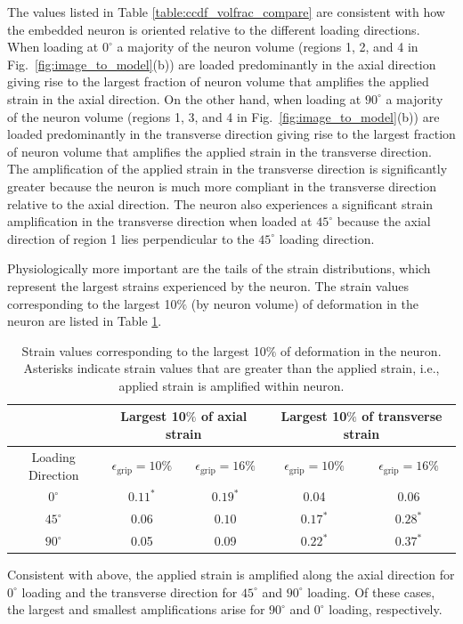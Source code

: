 \documentclass[]{interact}
\begin{document}
The values listed in Table \ref{table:ccdf_volfrac_compare} are consistent with how the embedded neuron is oriented relative to the different loading directions. When loading at $0^{\circ}$ a majority of the neuron volume (regions 1, 2, and 4 in Fig.\ \ref{fig:image_to_model}(b)) are loaded predominantly in the axial direction giving rise to the largest fraction of neuron volume that amplifies the applied strain in the axial direction. On the other hand, when loading at $90^{\circ}$ a majority of the neuron volume (regions 1, 3, and 4 in Fig.\ \ref{fig:image_to_model}(b)) are loaded predominantly in the transverse direction giving rise to the largest fraction of neuron volume that amplifies the applied strain in the transverse direction. The amplification of the applied strain in the transverse direction is significantly greater because the neuron is much more compliant in the transverse direction relative to the axial direction.  The neuron also experiences a significant strain amplification in the transverse direction when loaded at $45^{\circ}$ because the axial direction of region 1 lies perpendicular to the $45^{\circ}$ loading direction.

Physiologically more important are the tails of the strain distributions, which represent the largest strains experienced by the neuron. The strain values corresponding to the largest 10$\%$ (by neuron volume) of deformation in the neuron are listed in Table \ref{table:ccdf_tail_strains}. 
%
\begin{table}[ht]
\begin{center}
\begin{tabular}{ c c c c c }
\hline\hline
& \multicolumn{2}{c}{Largest 10$\%$ of axial strain} & \multicolumn{2}{c}{Largest 10$\%$ of transverse strain} \\ \hline 
Loading Direction & $\epsilon_{\text{grip}}=10\%$ & $\epsilon_{\text{grip}}=16\%$ & $\epsilon_{\text{grip}}=10\%$ & $\epsilon_{\text{grip}}=16\%$ \\
\hline 
$0^{\circ}$ & $0.11^*$ & $0.19^*$ & 0.04 & 0.06\\ 
$45^{\circ}$ & $0.06$ & $0.10$ & $0.17^*$ & $0.28^*$\\
$90^{\circ}$ & 0.05 & 0.09 & $0.22^*$ & $0.37^*$\\ \hline \hline
\end{tabular}
\end{center}
\caption{Strain values corresponding to the largest 10$\%$ of deformation in the neuron. Asterisks indicate strain values that are greater than the applied strain, i.e., applied strain is amplified within neuron.}
\label{table:ccdf_tail_strains}
\end{table}
%
Consistent with above, the applied strain is amplified along the axial direction for $0^{\circ}$ loading and the transverse direction for $45^{\circ}$ and $90^{\circ}$ loading. Of these cases, the largest and smallest amplifications arise for $90^{\circ}$ and $0^{\circ}$ loading, respectively.
\end{document}
